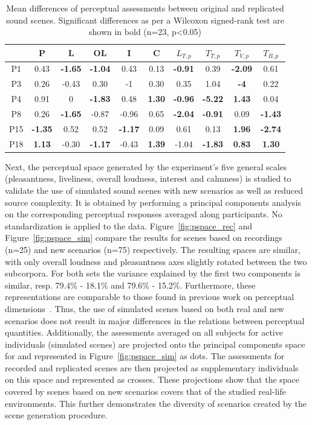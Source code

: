 \documentclass[twocolumn]{article}
\begin{document}
\begin{table}[t]
\centering
\caption{Mean differences of perceptual assessments between original and replicated sound scenes. Significant differences as per a Wilcoxon signed-rank test are shown in bold (n=23, p<0.05)}
\label{tab:ogrep}
\begin{tabular}{ c | c c c c c c c c c }
\hline
	 & P & L & OL & I & C & $L_{T, p}$ & $T_{T, p}$ & $T_{V, p}$ & $T_{B, p}$ \\ \hline
	P1 & 0.43 & \textbf{-1.65} & \textbf{-1.04} & 0.43 & 0.13 & \textbf{-0.91} & 0.39 & \textbf{-2.09} & 0.61 \\
	P3 & 0.26 & -0.43 & 0.30 & -1 & 0.30 & 0.35 & 1.04 & \textbf{-4} & 0.22 \\
	P4 & 0.91 & 0 & \textbf{-1.83} & 0.48 & \textbf{1.30} & \textbf{-0.96} & \textbf{-5.22} & \textbf{1.43} & 0.04 \\
	P8 & 0.26 & \textbf{-1.65} & -0.87 & -0.96 & 0.65 & \textbf{-2.04} & \textbf{-0.91} & 0.09 & \textbf{-1.43} \\
	P15 & \textbf{-1.35} & 0.52 & 0.52 & \textbf{-1.17} & 0.09 & 0.61 & 0.13 & \textbf{1.96} & \textbf{-2.74} \\
	P18 & \textbf{1.13} & -0.30 & \textbf{-1.17} & -0.43 & \textbf{1.39} & -1.04 & \textbf{-1.83} & \textbf{0.83} & \textbf{1.30} \\ \hline
\end{tabular}
\end{table}

Next, the perceptual space generated by the experiment's five general scales (pleasantness, liveliness, overall loudness, interest and calmness) is studied to validate the use of simulated sound scenes with new scenarios as well as reduced source complexity. It is obtained by performing a principal components analysis on the corresponding perceptual responses averaged along participants. No standardization is applied to the data. Figure~\ref{fig:pspace_rec} and Figure~\ref{fig:pspace_sim} compare the results for scenes based on recordings (n=25) and new scenarios (n=75) respectively. The resulting spaces are similar, with only overall loudness and pleasantness axes slightly rotated between the two subcorpora. For both sets the variance explained by the first two components is similar, resp. 79.4\% - 18.1\% and 79.6\% - 15.2\%. Furthermore, these representations are comparable to those found in previous work on perceptual dimensions~\cite{axelsson2010, cain2013}. Thus, the use of simulated scenes based on both real and new scenarios does not result in major differences in the relations between perceptual quantities. Additionally, the assessments averaged on all subjects for active individuals (simulated scenes) are projected onto the principal components space for and represented in Figure~\ref{fig:pspace_sim} as dots. The assessments for recorded and replicated scenes are then projected as supplementary individuals on this space and represented as crosses. These projections show that the space covered by scenes based on new scenarios covers that of the studied real-life environments. This further demonstrates the diversity of scenarios created by the scene generation procedure.
\end{document}
